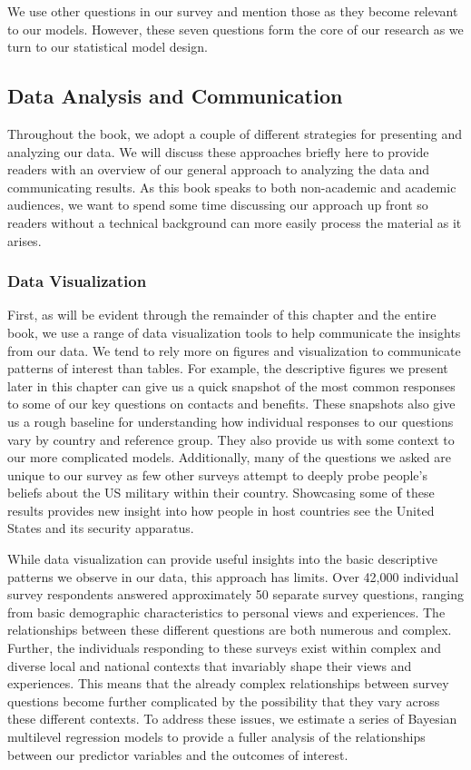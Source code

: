We use other questions in our survey and mention those as they become relevant to our models. However, these seven questions form the core of our research as we turn to our statistical model design.


\subsection*{Data Analysis and Communication}

Throughout the book, we adopt a couple of different strategies for presenting and analyzing our data. We will discuss these approaches briefly here to provide readers with an overview of our general approach to analyzing the data and communicating results. As this book speaks to both non-academic and academic audiences, we want to spend some time discussing our approach up front so readers without a technical background can more easily process the material as it arises. 

\subsubsection*{Data Visualization}

First, as will be evident through the remainder of this chapter and the entire book, we use a range of data visualization tools to help communicate the insights from our data. We tend to rely more on figures and visualization to communicate patterns of interest than tables. For example, the descriptive figures we present later in this chapter can give us a quick snapshot of the most common responses to some of our key questions on contacts and benefits. These snapshots also give us a rough baseline for understanding how individual responses to our questions vary by country and reference group. They also provide us with some context to our more complicated models. Additionally, many of the questions we asked are unique to our survey as few other surveys attempt to deeply probe people's beliefs about the US military within their country. Showcasing some of these results provides new insight into how people in host countries see the United States and its security apparatus. 

While data visualization can provide useful insights into the basic descriptive patterns we observe in our data, this approach has limits. Over 42,000 individual survey respondents answered approximately 50 separate survey questions, ranging from basic demographic characteristics to personal views and experiences. The relationships between these different questions are both numerous and complex. Further, the individuals responding to these surveys exist within complex and diverse local and national contexts that invariably shape their views and experiences. This means that the already complex relationships between survey questions become further complicated by the possibility that they vary across these different contexts. To address these issues, we estimate a series of Bayesian multilevel regression models to provide a fuller analysis of the relationships between our predictor variables and the outcomes of interest.


